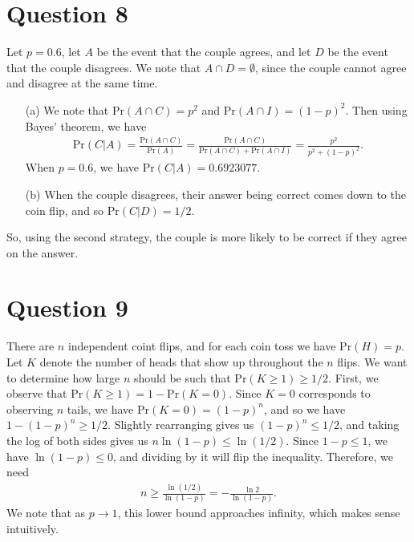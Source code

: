 \documentclass[10pt]{article}
\begin{document}
\section{Question 8} \noindent
Let \(p = 0.6\), let \(A\) be the event that the couple agrees, and let \(D\) be the event that the couple disagrees. We note that \(A \cap D = \emptyset\), 
since the couple cannot agree and disagree at the same time. 
\begin{itemize}
    \item[(a)] We note that \(\mathrm{Pr}(A \cap C) = p^2\) and \(\mathrm{Pr}(A \cap I) = (1-p)^2\). Then using Bayes' theorem, we have 
    \begin{align*}
        \mathrm{Pr}(C | A) = \frac{\mathrm{Pr}(A \cap C)}{\mathrm{Pr}(A)} = \frac{\mathrm{Pr}(A \cap C)}{\mathrm{Pr}(A \cap C) + \mathrm{Pr}(A \cap I)} 
        = \frac{p^2}{p^2 + (1-p)^2}.
    \end{align*}
    When \(p = 0.6\), we have \(\mathrm{Pr}(C | A) = 0.6923077\).
    \item[(b)] When the couple disagrees, their answer being correct comes down to the coin flip, and so \(\mathrm{Pr}(C | D) = 1/2\). 
\end{itemize}
So, using the second strategy, the couple is more likely to be correct if they agree on the answer. 

\section{Question 9} \noindent
There are \(n\) independent coint flips, and for each coin toss we have \(\mathrm{Pr}(H) = p\). Let \(K\) denote the number of heads that show up throughout
the \(n\) flips. We want to determine how large \(n\) should be such that \(\mathrm{Pr}(K \ge 1) \ge 1/2\). First, we observe that \(\mathrm{Pr}(K \ge 1) = 
1 - \mathrm{Pr}(K = 0)\). Since \(K = 0\) corresponds to observing \(n\) tails, we have \(\mathrm{Pr}(K = 0) = (1-p)^n\), and so we have 
\(1 - (1-p)^n \ge 1/2\). Slightly rearranging gives us \((1-p)^n \le 1/2\), and taking the log of both sides gives us \(n \ln(1 - p) \le \ln(1/2)\). Since 
\(1 - p \le 1\), we have \(\ln(1-p) \le 0\), and dividing by it will flip the inequality. Therefore, we need 
\begin{align*}
    n \ge \frac{\ln(1/2)}{\ln(1-p)} = - \frac{\ln 2}{\ln (1-p)}.
\end{align*}
We note that as \(p \to 1\), this lower bound approaches infinity, which makes sense intuitively.
\end{document}
